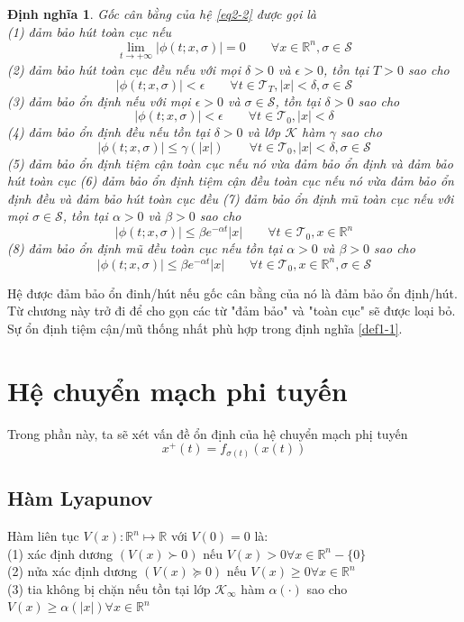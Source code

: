 \documentclass[14pt,a4paper,oneside]{report}		%
\newtheorem{define}[theorem]{Định nghĩa}
\begin{document}
\begin{define}
Gốc cân bằng của hệ \ref{eq2-2} được gọi là\\
(1) đảm bảo hút toàn cục nếu
$$\lim_{t\rightarrow +\infty}|\phi (t;x,\sigma)|=0\qquad\forall x\in\mathbb{R}^n, \sigma\in\mathcal{S}$$
(2) đảm bảo hút toàn cục đều nếu với mọi $\delta >0$ và $\epsilon >0$, tồn tại $T>0$ sao cho
$$|\phi (t;x,\sigma)|<\epsilon\qquad\forall t\in\mathcal{T}_T, |x|<\delta,\sigma\in\mathcal{S}$$
(3) đảm bảo ổn định nếu với mọi $\epsilon > 0$ và $\sigma\in\mathcal{S}$, tồn tại $\delta >0$ sao cho
$$|\phi (t;x,\sigma)|<\epsilon\qquad\forall t\in\mathcal{T}_0, |x|<\delta$$
(4) đảm bảo ổn định đều nếu tồn tại $\delta > 0$ và lớp $\mathcal{K}$ hàm $\gamma$ sao cho
$$|\phi (t;x,\sigma)|\leq \gamma(|x|)\qquad\forall t\in\mathcal{T}_0, |x|<\delta,\sigma\in\mathcal{S}$$
(5) đảm bảo ổn định tiệm cận toàn cục nếu nó vừa đảm bảo ổn định và đảm bảo hút toàn cục
(6) đảm bảo ổn định tiệm cận đều toàn cục nếu nó vừa đảm bảo ổn định đều và đảm bảo hút toàn cục đều
(7) đảm bảo ổn định mũ toàn cục nếu với mọi $\sigma\in\mathcal{S}$, tồn tại $\alpha>0$ và $\beta >0$ sao cho
$$|\phi (t;x,\sigma)|\leq \beta e^{-\alpha t}|x|\qquad\forall t\in\mathcal{T}_0, x\in\mathbb{R}^n$$
(8) đảm bảo ổn định mũ đều toàn cục nếu tồn tại $\alpha>0$ và $\beta >0$ sao cho
$$|\phi (t;x,\sigma)|\leq \beta e^{-\alpha t}|x|\qquad\forall t\in\mathcal{T}_0, x\in\mathbb{R}^n, \sigma\in\mathcal{S}$$
\end{define}

Hệ được đảm bảo ổn đinh/hút nếu gốc cân bằng của nó là đảm bảo ổn định/hút. Từ chương này trở đi để cho gọn các từ "đảm bảo" và "toàn cục" sẽ được loại bỏ. Sự ổn định tiệm cận/mũ thống nhất phù hợp trong định nghĩa \ref{def1-1}.

\section{Hệ chuyển mạch phi tuyến}
Trong phần này, ta sẽ xét vấn đề ổn định của hệ chuyển mạch phị tuyến
\begin{equation} \label{eq2-6}
x^+(t)=f_{\sigma (t)}(x(t))
\end{equation}
\subsection{Hàm Lyapunov}
Hàm liên tục $V(x): \mathbb{R}^n\mapsto \mathbb{R}$ với $V(0)=0$ là:\\
(1) xác định dương $(V(x)\succ 0)$ nếu $V(x)>0\forall x\in\mathbb{R}^n-\{0\}$ \\
(2) nửa xác định dương $(V(x)\succeq 0)$ nếu $V(x)\geq 0\forall x\in\mathbb{R}^n$ \\
(3) tia không bị chặn nếu tồn tại lớp $\mathcal{K}_\infty$ hàm $\alpha (\cdot)$ sao cho $V(x)\geq \alpha(|x|)\forall x\in\mathbb{R}^n$ \\
\end{document}
